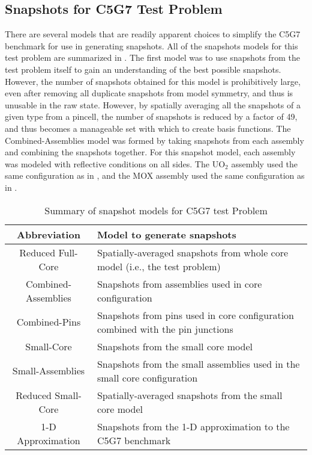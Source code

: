 \subsection{Snapshots for C5G7 Test Problem}
There are several models that are readily apparent choices to simplify the C5G7 
benchmark for use in generating snapshots.  All of the snapshots models for this 
test 
problem are summarized in .  The first model was to use snapshots from the 
test problem itself to 
gain an understanding of the best possible snapshots.  However, the number 
of snapshots obtained for this model is prohibitively large, even after 
removing all duplicate snapshots from model symmetry, and thus is unusable in the 
raw state.  However, by spatially averaging all the snapshots of a given type 
from a pincell, the number of snapshots is reduced by a factor of 49, and thus 
becomes a manageable set with which to create basis functions. The Combined-Assemblies model was 
formed by taking snapshots from each assembly and combining the snapshots together.  
For this snapshot model, each assembly was modeled with reflective conditions on 
all sides.  
The UO$_2$ assembly used the same configuration as in  
, 
and the MOX assembly used the same configuration as in  
.  

\begin{table*}[htb]
    \centering
    \caption{Summary of snapshot models for C5G7 test Problem}
    \begin{tabulary}{\linewidth}{c | L}\toprule
        Abbreviation         & Model to generate snapshots \\ \midrule
        Reduced Full-Core    & Spatially-averaged snapshots from whole core 
model (i.e.,         the test problem) \\
        Combined-Assemblies  & Snapshots from assemblies used in core 
                               configuration \\
        Combined-Pins        & Snapshots from pins used in core 
                               configuration combined with the pin 
                               junctions\\
        Small-Core           & Snapshots from the small core model \\
        Small-Assemblies     & Snapshots from the small assemblies used in the 
                               small core configuration \\
        Reduced Small-Core   & Spatially-averaged snapshots from the small core 
model \\
        1-D Approximation    & Snapshots from the 1-D approximation to the C5G7 
                               benchmark \\
        \bottomrule
    \end{tabulary}
    \label{tab:C5G7snapshots}
\end{table*}

